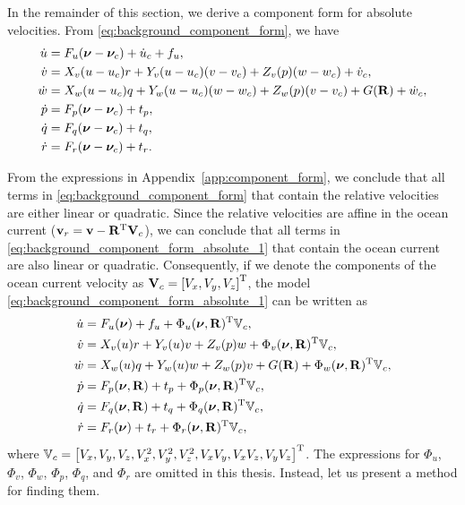 In the remainder of this section, we derive a component form for absolute velocities.
From \eqref{eq:background_component_form}, we have
\begin{subequations}
    \begin{align}
        \dot{u} &= F_u(\bm{\nu} - \bm{\nu}_c) + \dot{u}_c + f_u, \\
        \dot{v} &= X_v(u - u_c)r + Y_v(u - u_c)(v - v_c) + Z_v(p)(w - w_c) + \dot{v}_c, \\
        \dot{w} &= X_w(u - u_c)q + Y_w(u - u_c)(w - w_c) + Z_w(p)(v - v_c) + G(\mathbf{R}) + \dot{w}_c, \\
        \dot{p} &= F_p(\bm{\nu} - \bm{\nu}_c) + t_p, \\
        \dot{q} &= F_q(\bm{\nu} - \bm{\nu}_c) + t_q, \\
        \dot{r} &= F_r(\bm{\nu} - \bm{\nu}_c) + t_r.
    \end{align}
    \label{eq:background_component_form_absolute_1}
\end{subequations}%

From the expressions in Appendix~\ref{app:component_form}, we conclude that all terms in \eqref{eq:background_component_form} that contain the relative velocities are either linear or quadratic.
Since the relative velocities are affine in the ocean current ($\mathbf{v}_r = \mathbf{v} - \mathbf{R}^{\mathrm{T}}\mathbf{V}_c$), we can conclude that all terms in \eqref{eq:background_component_form_absolute_1} that contain the ocean current are also linear or quadratic. 
Consequently, if we denote the components of the ocean current velocity as $\mathbf{V}_c = \left[V_x, V_y, V_z\right]^{\mathrm{T}}$, the model \eqref{eq:background_component_form_absolute_1} can be written as
\begin{subequations}
    \begin{align}
        \dot{u} &= F_u(\bm{\nu}) + f_u + \Phi_u(\bm{\nu}, \mathbf{R})^{\mathrm{T}}\mathbb{V}_c, \\
        \dot{v} &= X_v(u)r + Y_v(u)v + Z_v(p)w + \Phi_v(\bm{\nu}, \mathbf{R})^{\mathrm{T}}\mathbb{V}_c, \\
        \dot{w} &= X_w(u)q + Y_w(u)w + Z_w(p)v + G(\mathbf{R}) + \Phi_w(\bm{\nu}, \mathbf{R})^{\mathrm{T}}\mathbb{V}_c, \\
        \dot{p} &= F_p(\bm{\nu}, \mathbf{R}) + t_p + \Phi_p(\bm{\nu}, \mathbf{R})^{\mathrm{T}}\mathbb{V}_c, \\
        \dot{q} &= F_q(\bm{\nu}, \mathbf{R}) + t_q + \Phi_q(\bm{\nu}, \mathbf{R})^{\mathrm{T}}\mathbb{V}_c, \\
        \dot{r} &= F_r(\bm{\nu}) + t_r + \Phi_r(\bm{\nu}, \mathbf{R})^{\mathrm{T}}\mathbb{V}_c,
    \end{align}
    \label{eq:background_component_form_absolute_2}
\end{subequations}
where $\mathbb{V}_c = \left[V_x, V_y, V_z, V_x^2, V_y^2, V_z^2, V_xV_y, V_xV_z, V_yV_z\right]^{\mathrm{T}}$.
The expressions for $\Phi_u$, $\Phi_v$, $\Phi_w$, $\Phi_p$, $\Phi_q$, and $\Phi_r$ are omitted in this thesis.
Instead, let us present a method for finding them.

